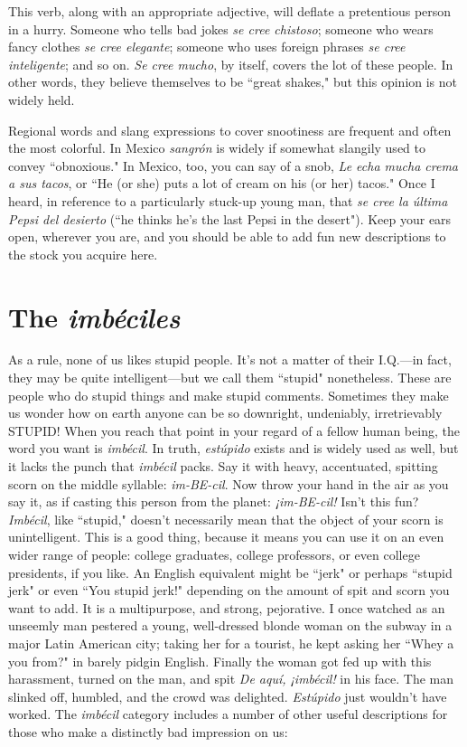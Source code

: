 This verb, along with an appropriate adjective, will
deflate a pretentious person in a hurry. Someone who tells bad jokes
\emph{se cree chistoso}; someone who wears fancy clothes \emph{se cree elegante};
someone who uses foreign phrases \emph{se cree inteligente}; and so on. \emph{Se
	cree mucho}, by itself, covers the lot of these people. In other words,
they believe themselves to be ``great shakes," but this opinion is not
widely held.

\bsk

Regional words and slang expressions to cover snootiness are
frequent and often the most colorful. In Mexico \emph{sangrón} is widely if
somewhat slangily used to convey ``obnoxious." In Mexico, too, you
can say of a snob, \emph{Le echa mucha crema a sus tacos}, or ``He (or she)
puts a lot of cream on his (or her) tacos." Once I heard, in reference to
a particularly stuck-up young man, that \emph{se cree la última Pepsi del
	desierto} (``he thinks he's the last Pepsi in the desert"). Keep your ears
open, wherever you are, and you should be able to add fun new descriptions to the stock you acquire here.

\section{The \emph{imbéciles}}

As a rule, none of us likes stupid people. It's not a matter of
their I.Q.---in fact, they may be quite intelligent---but we call them
``stupid" nonetheless. These are people who do stupid things and make
stupid comments. Sometimes they make us wonder how on earth anyone can be so downright, undeniably, irretrievably STUPID!
When you reach that point in your regard of a fellow human
being, the word you want is \emph{imbécil}. In truth, \emph{estúpido} exists and is
widely used as well, but it lacks the punch that \emph{imbécil} packs. Say it
with heavy, accentuated, spitting scorn on the middle syllable: \emph{im-BE-cil}. Now throw your hand in the air as you say it, as if casting this
person from the planet: \emph{¡im-BE-cil!} Isn't this fun?
\emph{Imbécil}, like ``stupid," doesn't necessarily mean that the object of your scorn is unintelligent. This is a good thing, because it
means you can use it on an even wider range of people: college graduates, college professors, or even college presidents, if you like. An English equivalent might be ``jerk" or perhaps ``stupid jerk" or even ``You
stupid jerk!" depending on the amount of spit and scorn you want to
add. It is a multipurpose, and strong, pejorative. I once watched as an
unseemly man pestered a young, well-dressed blonde woman on the
subway in a major Latin American city; taking her for a tourist, he
kept asking her ``Whey a you from?" in barely pidgin English. Finally
the woman got fed up with this harassment, turned on the man, and
spit \emph{De aquí, ¡imbécil!} in his face. The man slinked off, humbled, and
the crowd was delighted. \emph{Estúpido} just wouldn't have worked.
The \emph{imbécil} category includes a number of other useful descriptions for those who make a distinctly bad impression on us:


